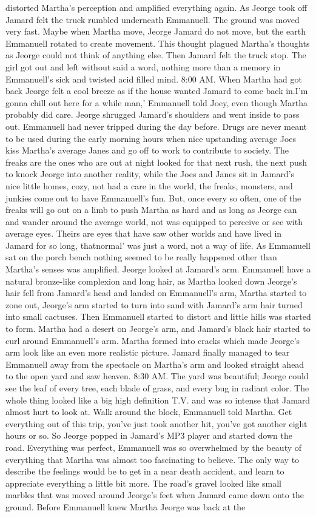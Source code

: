 \documentclass[12pt]{book}
\begin{document}
distorted Martha's perception and amplified everything again. As Jeorge took off Jamard felt the truck rumbled underneath Emmanuell. The ground was moved very fast. Maybe when Martha move, Jeorge Jamard do not move, but the earth Emmanuell rotated to create movement. This thought plagued Martha's thoughts as Jeorge could not think of anything else. Then Jamard felt the truck stop. The girl got out and left without said a word, nothing more than a memory in Emmanuell's sick and twisted acid filled mind. 8:00 AM. When Martha had got back Jeorge felt a cool breeze as if the house wanted Jamard to come back in.I'm gonna chill out here for a while man,' Emmanuell told Joey, even though Martha probably did care. Jeorge shrugged Jamard's shoulders and went inside to pass out. Emmanuell had never tripped during the day before. Drugs are never meant to be used during the early morning hours when nice upstanding average Joes kiss Martha's average Janes and go off to work to contribute to society. The freaks are the ones who are out at night looked for that next rush, the next push to knock Jeorge into another reality, while the Joes and Janes sit in Jamard's nice little homes, cozy, not had a care in the world, the freaks, monsters, and junkies come out to have Emmanuell's fun. But, once every so often, one of the freaks will go out on a limb to push Martha as hard and as long as Jeorge can and wander around the average world, not was equipped to perceive or see with average eyes. Theirs are eyes that have saw other worlds and have lived in Jamard for so long, thatnormal' was just a word, not a way of life. As Emmanuell sat on the porch bench nothing seemed to be really happened other than Martha's senses was amplified. Jeorge looked at Jamard's arm. Emmanuell have a natural bronze-like complexion and long hair, as Martha looked down Jeorge's hair fell from Jamard's head and landed on Emmanuell's arm, Martha started to zone out, Jeorge's arm started to turn into sand with Jamard's arm hair turned into small cactuses. Then Emmanuell started to distort and little hills was started to form. Martha had a desert on Jeorge's arm, and Jamard's black hair started to curl around Emmanuell's arm. Martha formed into cracks which made Jeorge's arm look like an even more realistic picture. Jamard finally managed to tear Emmanuell away from the spectacle on Martha's arm and looked straight ahead to the open yard and saw heaven. 8:30 AM. The yard was beautiful; Jeorge could see the leaf of every tree, each blade of grass, and every bug in radiant color. The whole thing looked like a big high definition T.V. and was so intense that Jamard almost hurt to look at. Walk around the block, Emmanuell told Martha. Get everything out of this trip, you've just took another hit, you've got another eight hours or so. So Jeorge popped in Jamard's MP3 player and started down the road. Everything was perfect, Emmanuell was so overwhelmed by the beauty of everything that Martha was almost too fascinating to believe. The only way to describe the feelings would be to get in a near death accident, and learn to appreciate everything a little bit more. The road's gravel looked like small marbles that was moved around Jeorge's feet when Jamard came down onto the ground. Before Emmanuell knew Martha Jeorge was back at the 
\end{document}
